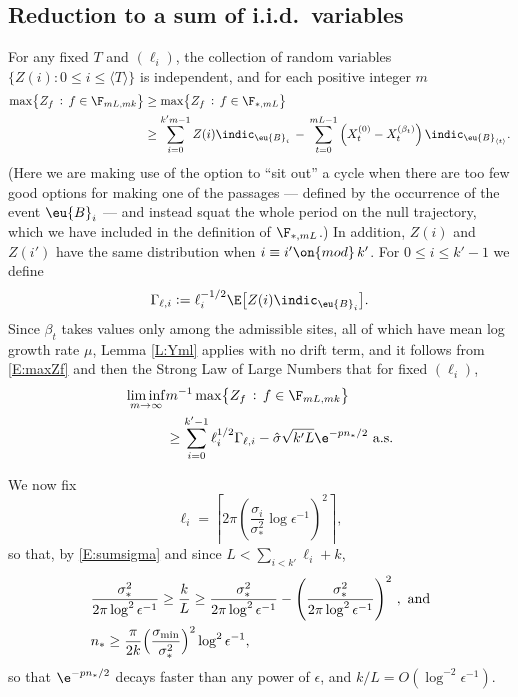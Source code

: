 \documentclass[11pt]{amsart}
\begin{document}
\subsection{Reduction to a sum of i.i.d.\ variables}
For any fixed $T$ and $(\ell_i)$, the collection of random variables ${\{Z(i): 0\le i \le \langle T \rangle \}}$
is independent, and for each positive integer $m$
\begin{align}
	\max\bigl\{ Z_{f}\, :\, f\in \F_{m L, mk} \bigr\}
	&\ge \max\bigl\{ Z_{f}\, :\, f\in \F_{*,m L} \bigr\} \notag\\
	& \ge  \sum_{i=0}^{k' m-1} Z( i) \indic_{\eu{B}_i} \, - \,
	\sum_{t=0}^{mL-1} \left( X^{(0)}_{t} - X^{(\beta_{t})}_{t} \right) \indic_{\eu{B}_{\langle t \rangle}}.\label{E:maxZf}
\end{align}
(Here we are making use of the option to ``sit out'' a cycle when there are too few good options for making one of the passages --- defined by the occurrence of the event $\eu{B}_i$ --- and instead squat the whole period on the null trajectory, which we have included in the definition of $\F_{*,m L}$.)
In addition, $Z(i)$ and $Z(i')$ have the same distribution when $i \equiv i' \on{mod}\, k'$.
For $0\le i\le k'-1$ we define
\begin{equation} \label{E:Gammal}
	\Gamma_{\ell,i}:=\ell_i^{-1/2}\E\bigl[ Z(i) \indic_{\eu{B}_i}\bigr].
\end{equation}
Since $\beta_t$ takes values only among the admissible sites, all of which have mean log growth rate $\mu$,
Lemma \ref{L:Yml} applies with no drift term, and it follows from \eqref{E:maxZf} and then the Strong Law of Large Numbers that for fixed $(\ell_i)$,
\begin{equation} \label{E:maxZf2}
	\begin{split}
		\liminf_{m\to\infty}&m^{-1}\max\bigl\{ Z_{f}\, :\, f\in \F_{mL , mk} \bigr\} \\
		& \ge \sum_{i=0}^{k'-1} \ell^{1/2}_i \Gamma_{\ell,i}  - \hat\sigma \sqrt{k'L}\e^{-p n_*/2}
		\text{ a.s.}
	\end{split}
\end{equation}

We now fix
\begin{equation} \label{E:elli}
	\ell_i = \left\lceil 2\pi \left( \frac{\sigma_i}{ \sigma_*^2} \log \epsilon^{-1} \right)^2 \right\rceil,
\end{equation}
so that, by \eqref{E:sumsigma} and since $L<\sum_{i<k'}\ell_i+k$,
\begin{align}
	\label{E:kLbound}	&\frac{\sigma_*^2}{2\pi \log^2 \epsilon^{-1}} \ge
	\frac{k}{L} \ge
	\frac{\sigma_*^2}{2\pi \log^2 \epsilon^{-1}} - \left( \frac{\sigma_*^2}{2\pi \log^2 \epsilon^{-1}}  \right)^2
	\, ,\text{ and}\\
	\label{E:nstarbound}	&n_*\ge \frac{\pi}{2k} \Bigl(\frac{\sigma_{\min}}{\sigma_*^2} \Bigr)^2  \log^2 \epsilon^{-1} ,
\end{align}
so that $\e^{-p n_*/2}$ decays faster than any power of $\epsilon$, and $k/L=O(\log^{-2}\epsilon^{-1})$.
\end{document}
